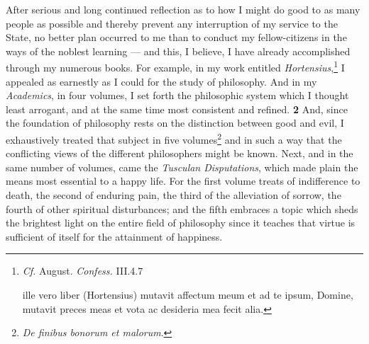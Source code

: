 After serious and long continued reflection as to how I might do good to as many people as possible and thereby prevent any interruption of my service to the State, no better plan occurred to me than to conduct my fellow-citizens in the ways of the noblest learning \texthebrew{—} and this, I believe, I have already accomplished through my numerous books. For example, in my work entitled \emph{Hortensius},\texthebrew{}\footnote{\emph{Cf.} August. \emph{Confess.} III.4.7

ille vero liber (Hortensius) mutavit affectum meum et ad te ipsum, Domine, mutavit preces meas et vota ac desideria mea fecit alia.

} I appealed as earnestly as I could for the study of philosophy. And in my \emph{Academics}, in four volumes, I set forth the philosophic system which I thought least arrogant, and at the same time most consistent and refined. \textbf{2} And, since the foundation of philosophy rests on the distinction between good and evil, I exhaustively treated that subject in five volumes\texthebrew{}\footnote{\emph{De finibus bonorum et malorum}.

} and in such a way that the conflicting views of the different philosophers might be known. Next, and in the same number of volumes, came the \emph{Tusculan Disputations}, which made plain the means most essential to a happy life. For the first volume treats of indifference to death, the second of enduring pain, the third of the alleviation of sorrow, the fourth of other spiritual disturbances; and the fifth embraces a topic which sheds the brightest light on the entire field of philosophy since it teaches that virtue is sufficient of itself for the attainment of happiness.

